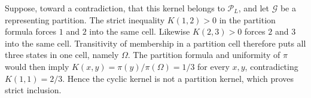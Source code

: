 Suppose, toward a contradiction, that this kernel belongs to \(\mathcal P_L\), and let \(\mathcal G\) be a representing partition.  The strict inequality \(K(1,2)>0\) in the partition formula forces \(1\) and \(2\) into the same cell.  Likewise \(K(2,3)>0\) forces \(2\) and \(3\) into the same cell.  Transitivity of membership in a partition cell therefore puts all three states in one cell, namely \(\Omega\).  The partition formula and uniformity of \(\pi\) would then imply \(K(x,y)=\pi(y)/\pi(\Omega)=1/3\) for every \(x,y\), contradicting \(K(1,1)=2/3\).  Hence the cyclic kernel is not a partition kernel, which proves strict inclusion.
